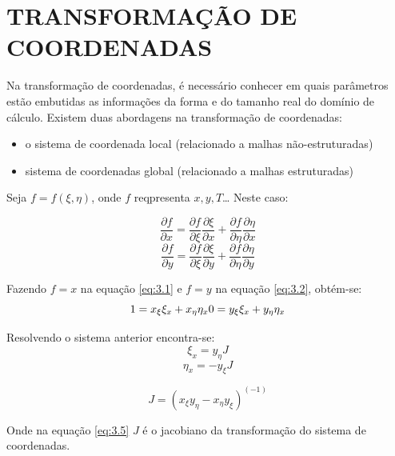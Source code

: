 \chapter[TRANSFORMAÇÃO DE COORDENADAS]{TRANSFORMAÇÃO DE COORDENADAS}

Na transformação de coordenadas, é necessário conhecer em quais parâmetros estão embutidas as informações da forma e do tamanho real do domínio de cálculo. \cite{Maliska2004} Existem duas abordagens na transformação de coordenadas:
\begin{itemize}
    \item o sistema de coordenada local (relacionado a malhas não-estruturadas)
    \item sistema de coordenadas global (relacionado a malhas estruturadas)
\end{itemize}

Seja $f=f(\xi, \eta)$, onde $f$ reqpresenta $x,y,T$\dots
Neste caso:

\begin{equation}
    \frac{\partial f}{\partial x} = \frac{\partial f}{\partial \xi}\frac{\partial \xi}{\partial x}+\frac{\partial f}{\partial \eta}\frac{\partial \eta}{\partial x}
    \label{eq:3.1}
\end{equation}
\begin{equation}
    \frac{\partial f}{\partial y} = \frac{\partial f}{\partial \xi}\frac{\partial \xi}{\partial y}+\frac{\partial f}{\partial \eta}\frac{\partial \eta}{\partial y}
    \label{eq:3.2}
\end{equation}

Fazendo $f=x$ na equação \ref{eq:3.1} e $f=y$ na equação \ref{eq:3.2}, obtém-se:
\begin{equation*}
    1 = x_\xi \xi_x + x_\eta \eta_x\\
    0 = y_\xi \xi_x + y_\eta \eta_x
\end{equation*}

Resolvendo o sistema anterior encontra-se:
\begin{equation}
    \label{eq:3.3}
    \xi_x = y_\eta J
\end{equation}
\begin{equation}
    \label{eq:3.4}
    \eta_x = -y_\xi J
\end{equation}

\begin{equation}
    J = (x_\xi y_\eta - x_\eta y_\xi)^(-1)
    \label{eq:3.5}
\end{equation}

Onde na equação \ref{eq:3.5} $J$  é o jacobiano da transformação do sistema de coordenadas.

